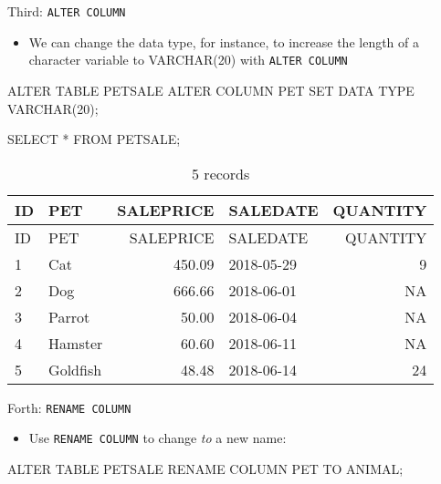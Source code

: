 \documentclass[
  letterpaper,
  DIV=11,
  numbers=noendperiod]{scrreprt}
\newenvironment{Shaded}{\begin{snugshade}}{\end{snugshade}}
\newcommand{\DataTypeTok}[1]{\textcolor[rgb]{0.68,0.00,0.00}{#1}}
\newcommand{\DecValTok}[1]{\textcolor[rgb]{0.68,0.00,0.00}{#1}}
\newcommand{\KeywordTok}[1]{\textcolor[rgb]{0.00,0.23,0.31}{#1}}
\newcommand{\NormalTok}[1]{\textcolor[rgb]{0.00,0.23,0.31}{#1}}
\newcommand{\OperatorTok}[1]{\textcolor[rgb]{0.37,0.37,0.37}{#1}}
\providecommand{\tightlist}{%
  \setlength{\itemsep}{0pt}\setlength{\parskip}{0pt}}\usepackage{longtable,booktabs,array}
\begin{document}
Third: \texttt{ALTER\ COLUMN}

\begin{itemize}
\tightlist
\item
  We can change the data type, for instance, to increase the length of a
  character variable to VARCHAR(20) with \texttt{ALTER\ COLUMN}
\end{itemize}

\begin{Shaded}
\begin{Highlighting}[]
\KeywordTok{ALTER} \KeywordTok{TABLE}\NormalTok{ PETSALE}
\KeywordTok{ALTER} \KeywordTok{COLUMN}\NormalTok{ PET }\KeywordTok{SET} \KeywordTok{DATA} \KeywordTok{TYPE} \DataTypeTok{VARCHAR}\NormalTok{(}\DecValTok{20}\NormalTok{);}
\end{Highlighting}
\end{Shaded}

\begin{Shaded}
\begin{Highlighting}[]
\KeywordTok{SELECT} \OperatorTok{*} \KeywordTok{FROM}\NormalTok{ PETSALE;}
\end{Highlighting}
\end{Shaded}

\begin{longtable}[]{@{}llrlr@{}}
\caption{5 records}\tabularnewline
\toprule()
ID & PET & SALEPRICE & SALEDATE & QUANTITY \\
\midrule()
\endfirsthead
\toprule()
ID & PET & SALEPRICE & SALEDATE & QUANTITY \\
\midrule()
\endhead
1 & Cat & 450.09 & 2018-05-29 & 9 \\
2 & Dog & 666.66 & 2018-06-01 & NA \\
3 & Parrot & 50.00 & 2018-06-04 & NA \\
4 & Hamster & 60.60 & 2018-06-11 & NA \\
5 & Goldfish & 48.48 & 2018-06-14 & 24 \\
\bottomrule()
\end{longtable}

Forth: \texttt{RENAME\ COLUMN}

\begin{itemize}
\tightlist
\item
  Use \texttt{RENAME\ COLUMN} to change \emph{to} a new name:
\end{itemize}

\begin{Shaded}
\begin{Highlighting}[]
\KeywordTok{ALTER} \KeywordTok{TABLE}\NormalTok{ PETSALE}
\KeywordTok{RENAME} \KeywordTok{COLUMN}\NormalTok{ PET }\KeywordTok{TO}\NormalTok{ ANIMAL;}
\end{Highlighting}
\end{Shaded}
\end{document}
